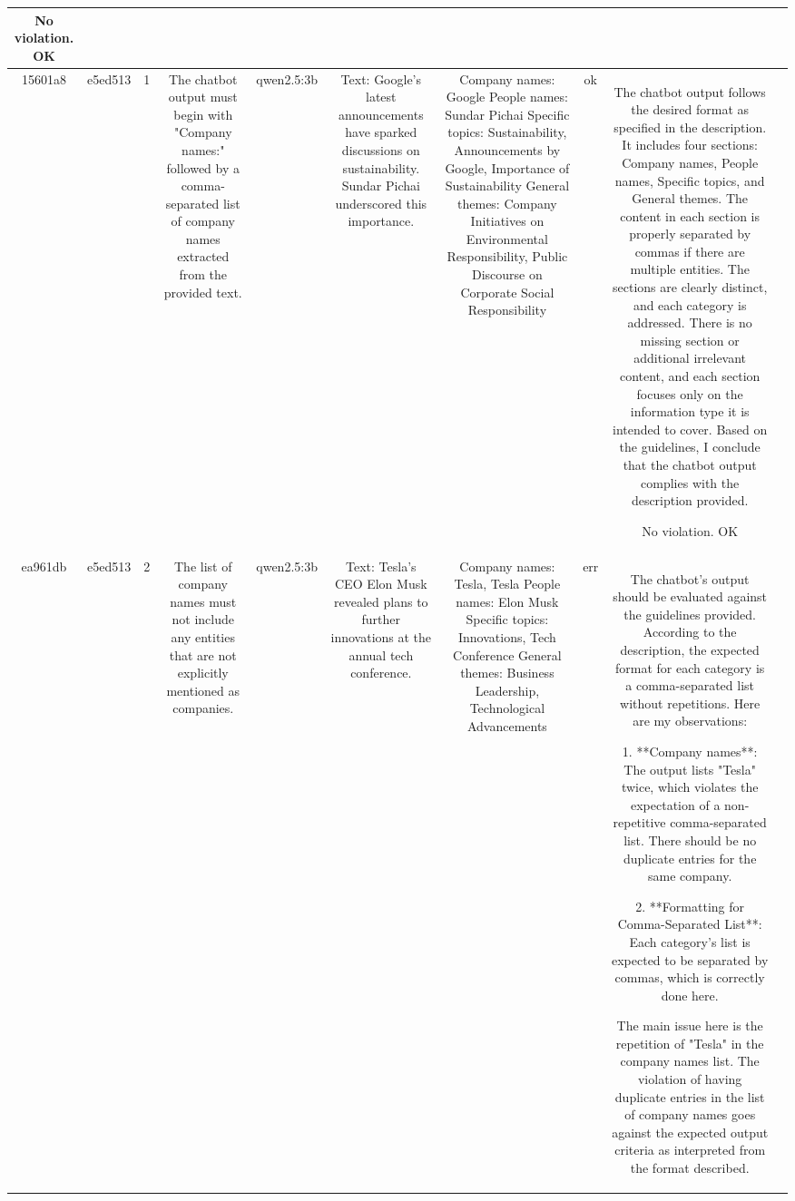 \begin{table}[h!]
\begin{tabular}{|c|c|c|c|c|c|c|c|c|c|}
No violation.
OK & \\
\hline
15601a8 & e5ed513 & 1 & The chatbot output must begin with "Company names:" followed by a comma-separated list of company names extracted from the provided text. & qwen2.5:3b & Text: Google's latest announcements have sparked discussions on sustainability. Sundar Pichai underscored this importance. & Company names: Google
People names: Sundar Pichai
Specific topics: Sustainability, Announcements by Google, Importance of Sustainability
General themes: Company Initiatives on Environmental Responsibility, Public Discourse on Corporate Social Responsibility & ok & The chatbot output follows the desired format as specified in the description. It includes four sections: Company names, People names, Specific topics, and General themes. The content in each section is properly separated by commas if there are multiple entities. The sections are clearly distinct, and each category is addressed. There is no missing section or additional irrelevant content, and each section focuses only on the information type it is intended to cover. Based on the guidelines, I conclude that the chatbot output complies with the description provided.

No violation.
OK & \\
\hline
ea961db & e5ed513 & 2 & The list of company names must not include any entities that are not explicitly mentioned as companies. & qwen2.5:3b & Text: Tesla's CEO Elon Musk revealed plans to further innovations at the annual tech conference. & Company names: Tesla, Tesla
People names: Elon Musk
Specific topics: Innovations, Tech Conference
General themes: Business Leadership, Technological Advancements & err & The chatbot's output should be evaluated against the guidelines provided. According to the description, the expected format for each category is a comma-separated list without repetitions. Here are my observations:

1. **Company names**: The output lists "Tesla" twice, which violates the expectation of a non-repetitive comma-separated list. There should be no duplicate entries for the same company.

2. **Formatting for Comma-Separated List**: Each category's list is expected to be separated by commas, which is correctly done here.

The main issue here is the repetition of "Tesla" in the company names list. The violation of having duplicate entries in the list of company names goes against the expected output criteria as interpreted from the format described.


\end{tabular}
\end{table}
